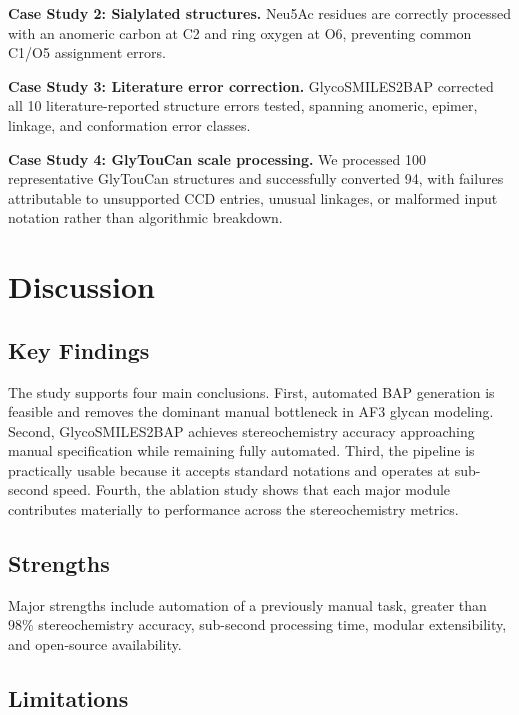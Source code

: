 \documentclass[11pt,a4paper]{article}
\begin{document}
\textbf{Case Study 2: Sialylated structures.} Neu5Ac residues are correctly processed with an anomeric carbon at C2 and ring oxygen at O6, preventing common C1/O5 assignment errors.

\textbf{Case Study 3: Literature error correction.} GlycoSMILES2BAP corrected all 10 literature-reported structure errors tested, spanning anomeric, epimer, linkage, and conformation error classes.

\textbf{Case Study 4: GlyTouCan scale processing.} We processed 100 representative GlyTouCan structures and successfully converted 94, with failures attributable to unsupported CCD entries, unusual linkages, or malformed input notation rather than algorithmic breakdown.

\section{Discussion}

\subsection{Key Findings}

The study supports four main conclusions. First, automated BAP generation is feasible and removes the dominant manual bottleneck in AF3 glycan modeling. Second, GlycoSMILES2BAP achieves stereochemistry accuracy approaching manual specification while remaining fully automated. Third, the pipeline is practically usable because it accepts standard notations and operates at sub-second speed. Fourth, the ablation study shows that each major module contributes materially to performance across the stereochemistry metrics.

\subsection{Strengths}

Major strengths include automation of a previously manual task, greater than 98\% stereochemistry accuracy, sub-second processing time, modular extensibility, and open-source availability.

\subsection{Limitations}
\end{document}
